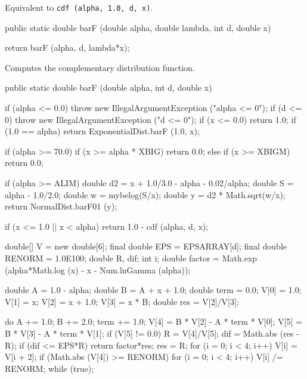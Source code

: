   \begin{tabb}
  Equivalent to \texttt{cdf (alpha, 1.0, d, x)}.
  \end{tabb}
\begin{code}

   public static double barF (double alpha, double lambda, int d, double x)\begin{hide} {
      return barF (alpha, d, lambda*x);
   }\end{hide}
\end{code}
\begin{tabb} Computes the complementary distribution function.
\end{tabb}
\begin{code}

   public static double barF (double alpha, int d, double x)\begin{hide} {
      if (alpha <= 0.0)
        throw new IllegalArgumentException ("alpha <= 0");
      if (d <= 0)
        throw new IllegalArgumentException ("d <= 0");
      if (x <= 0.0)
         return 1.0;
      if (1.0 == alpha)
         return ExponentialDist.barF (1.0, x);

      if (alpha >= 70.0) {
         if (x >= alpha * XBIG)
            return 0.0;
      } else {
         if (x >= XBIGM)
            return 0.0;
      }

      if (alpha >= ALIM) {
         double d2 = x + 1.0/3.0 - alpha - 0.02/alpha;
         double S = alpha - 1.0/2.0;
         double w = mybelog(S/x);
         double y = d2 * Math.sqrt(w/x);
         return NormalDist.barF01 (y);
      }

      if (x <= 1.0 || x < alpha)
         return 1.0 - cdf (alpha, d, x);

      double[] V = new double[6];
      final double EPS = EPSARRAY[d];
      final double RENORM = 1.0E100;
      double R, dif;
      int i;
      double factor = Math.exp (alpha*Math.log (x) - x - Num.lnGamma (alpha));

      double A = 1.0 - alpha;
      double B = A + x + 1.0;
      double term = 0.0;
      V[0] = 1.0;
      V[1] = x;
      V[2] = x + 1.0;
      V[3] = x * B;
      double res = V[2]/V[3];

      do {
         A += 1.0;
         B += 2.0;
         term += 1.0;
         V[4] = B * V[2] - A * term * V[0];
         V[5] = B * V[3] - A * term * V[1];
         if (V[5] != 0.0) {
            R = V[4]/V[5];
            dif = Math.abs (res - R);
            if (dif <= EPS*R)
               return factor*res;
            res = R;
         }
         for (i = 0; i < 4; i++)
            V[i] = V[i + 2];
         if (Math.abs (V[4]) >= RENORM) {
            for (i = 0; i < 4; i++)
               V[i] /= RENORM;
         }
      } while (true);
   }\end{hide}
\end{code}
